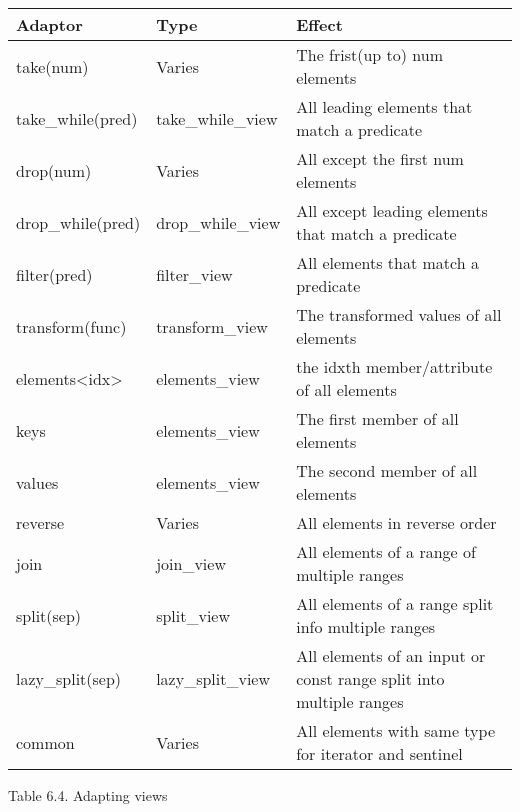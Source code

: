 \begin{table}[H]
\centering
\begin{tabular}{|l|l|l|}
	\hline
	\textbf{Adaptor} & \textbf{Type}   & \textbf{Effect}                                       \\ \hline
	take(num)        & Varies          & The frist(up to) num elements                         \\ \hline
	take\_while(pred)                    & take\_while\_view & All leading elements that match a predicate                        \\ \hline
	drop(num)        & Varies          & All except the first num elements                     \\ \hline
	drop\_while(pred)                    & drop\_while\_view & All except leading elements that match a predicate                 \\ \hline
	filter(pred)     & filter\_view    & All elements that match a predicate                   \\ \hline
	transform(func)  & transform\_view & The transformed values of all elements                \\ \hline
	elements\textless{}idx\textgreater{} & elements\_view    & the idxth member/attribute of all elements                         \\ \hline
	keys             & elements\_view  & The first member of all elements                      \\ \hline
	values           & elements\_view  & The second member of all elements                     \\ \hline
	reverse          & Varies          & All elements in reverse order                         \\ \hline
	join             & join\_view      & All elements of a range of multiple ranges            \\ \hline
	split(sep)       & split\_view     & All elements of a range split info multiple ranges    \\ \hline
	lazy\_split(sep)                     & lazy\_split\_view & All elements of an input or const range split into multiple ranges \\ \hline
	common           & Varies          & All elements with same type for iterator and sentinel \\ \hline
\end{tabular}
\end{table}

\begin{center}
Table 6.4. Adapting views
\end{center}

